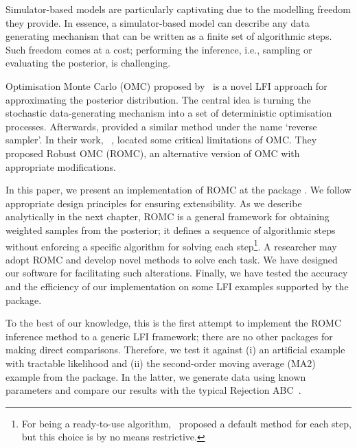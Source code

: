 Simulator-based models are particularly captivating due to the
modelling freedom they provide. In essence, a simulator-based model
can describe any data generating mechanism that can be written as a
finite set of algorithmic steps. Such freedom comes at a cost;
performing the inference, i.e., sampling or evaluating the posterior,
is challenging.

Optimisation Monte Carlo (OMC) proposed by~\citet{Meeds2015} is a
novel LFI approach for approximating the posterior distribution. The
central idea is turning the stochastic data-generating mechanism into
a set of deterministic optimisation processes. Afterwards,
\citet{Forneron2016} provided a similar method under the name `reverse
sampler'. In their work, ~\citet{Ikonomov2019}, located some critical
limitations of OMC. They proposed Robust OMC (ROMC), an alternative
version of OMC with appropriate modifications.

In this paper, we present an implementation of ROMC at the
 package . We follow appropriate design principles for ensuring
extensibility. As we describe analytically in the next chapter, ROMC
is a general framework for obtaining weighted samples from the
posterior; it defines a sequence of algorithmic steps without
enforcing a specific algorithm for solving each step\footnote{For
being a ready-to-use algorithm,~\citet{Ikonomov2019} proposed a
default method for each step, but this choice is by no means
restrictive.}. A researcher may adopt ROMC and develop novel methods
to solve each task. We have designed our software for facilitating
such alterations. Finally, we have tested the accuracy and the
efficiency of our implementation on some LFI examples supported by the
 package.

To the best of our knowledge, this is the first attempt to implement
the ROMC inference method to a generic LFI framework; there are no
other packages for making direct comparisons. Therefore, we test it
against (i) an artificial example with tractable likelihood and (ii)
the second-order moving average (MA2) example from the 
package. In the latter, we generate data using known parameters and
compare our results with the typical Rejection ABC~\citet{Beaumont2002}.